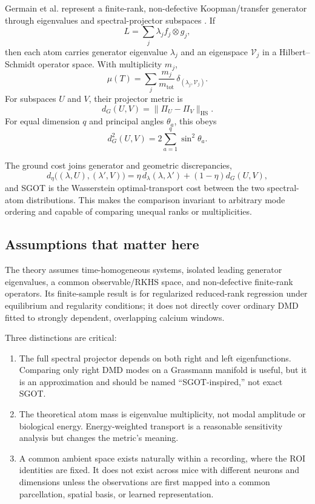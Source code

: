 \documentclass[11pt,a4paper]{article}
\begin{document}
Germain et al. represent a finite-rank, non-defective Koopman/transfer generator through eigenvalues and spectral-projector subspaces \citep{germain2026}. If
\begin{equation}
  L=\sum_j \lambda_j f_j\otimes g_j,
\end{equation}
then each atom carries generator eigenvalue $\lambda_j$ and an eigenspace $\mathcal V_j$ in a Hilbert--Schmidt operator space. With multiplicity $m_j$,
\begin{equation}
  \mu(T)=\sum_j \frac{m_j}{m_{\mathrm{tot}}}\,
  \delta_{(\lambda_j,\mathcal V_j)}.
\end{equation}
For subspaces $U$ and $V$, their projector metric is
\begin{equation}
  d_G(U,V)=\|\Pi_U-\Pi_V\|_{\mathrm{HS}}.
\end{equation}
For equal dimension $q$ and principal angles $\theta_a$, this obeys
\begin{equation}
  d_G^2(U,V)=2\sum_{a=1}^{q}\sin^2\theta_a.
\end{equation}

The ground cost joins generator and geometric discrepancies,
\begin{equation}
 d_\eta\big((\lambda,U),(\lambda',V)\big)
 =\eta\,d_\lambda(\lambda,\lambda')+(1-\eta)d_G(U,V),
\end{equation}
and SGOT is the Wasserstein optimal-transport cost between the two spectral-atom distributions. This makes the comparison invariant to arbitrary mode ordering and capable of comparing unequal ranks or multiplicities.

\subsection{Assumptions that matter here}

The theory assumes time-homogeneous systems, isolated leading generator eigenvalues, a common observable/RKHS space, and non-defective finite-rank operators. Its finite-sample result is for regularized reduced-rank regression under equilibrium and regularity conditions; it does not directly cover ordinary DMD fitted to strongly dependent, overlapping calcium windows.

Three distinctions are critical:

\begin{enumerate}
  \item The full spectral projector depends on both right and left eigenfunctions. Comparing only right DMD modes on a Grassmann manifold is useful, but it is an approximation and should be named ``SGOT-inspired,'' not exact SGOT.
  \item The theoretical atom mass is eigenvalue multiplicity, not modal amplitude or biological energy. Energy-weighted transport is a reasonable sensitivity analysis but changes the metric's meaning.
  \item A common ambient space exists naturally within a recording, where the ROI identities are fixed. It does not exist across mice with different neurons and dimensions unless the observations are first mapped into a common parcellation, spatial basis, or learned representation.
\end{enumerate}
\end{document}
